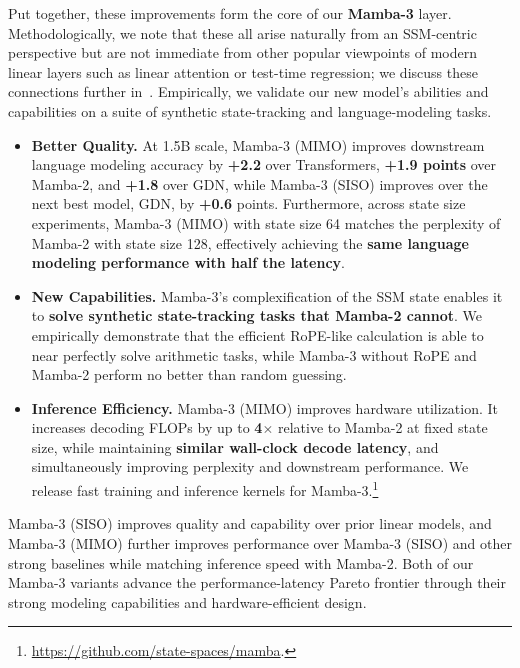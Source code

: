 Put together, these improvements form the core of our \textbf{Mamba-3} layer.
Methodologically, we note that these all arise naturally from an SSM-centric perspective but are not immediate from other popular viewpoints of modern linear layers such as linear attention or test-time regression;
we discuss these connections further in~.
Empirically, we validate our new model's abilities and capabilities on a suite of synthetic state-tracking and language-modeling tasks.

\begin{itemize}[itemsep=0.1pt,topsep=0pt,leftmargin=*]
    \item \textbf{Better Quality.} 
    At 1.5B scale, Mamba-3 (MIMO) improves downstream language modeling accuracy by \textbf{+2.2} over Transformers, \textbf{+1.9 points} over Mamba-2, and \textbf{+1.8} over GDN, while Mamba-3 (SISO) improves over the next best model, GDN, by \textbf{+0.6} points.
    Furthermore, across state size experiments, Mamba-3 (MIMO) with state size 64 matches the perplexity of Mamba-2 with state size 128, effectively achieving the \textbf{same language modeling performance with half the latency}.
    \item \textbf{New Capabilities.} Mamba-3's complexification of the SSM state enables it to \textbf{solve synthetic state-tracking tasks that Mamba-2 cannot}. We empirically demonstrate that the efficient RoPE-like calculation is able to near perfectly solve arithmetic tasks, while Mamba-3 without RoPE and Mamba-2 perform no better than random guessing.
    \item \textbf{Inference Efficiency.} Mamba-3 (MIMO) improves hardware utilization. It increases decoding FLOPs by up to \textbf{4$\times$} relative to Mamba-2 at fixed state size, while maintaining \textbf{similar wall-clock decode latency}, and simultaneously improving perplexity and downstream performance. We release fast training and inference kernels for Mamba-3.\footnote{\url{https://github.com/state-spaces/mamba}.}
\end{itemize}

Mamba-3 (SISO) improves quality and capability over prior linear models, and Mamba-3 (MIMO) further improves performance over Mamba-3 (SISO) and other strong baselines while matching inference speed with Mamba-2.
Both of our Mamba-3 variants advance the performance-latency Pareto frontier through their strong modeling capabilities and hardware-efficient design.
